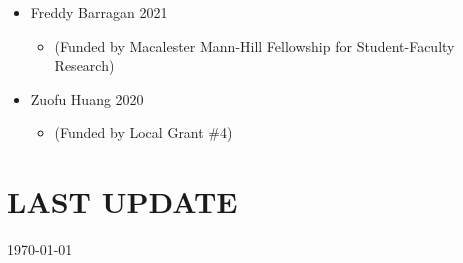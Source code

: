 \documentclass[margin]{res}
\begin{document}
\begin{resume}
\begin{itemize}
\item Freddy Barragan \hfill 2021 
	\begin{itemize}[leftmargin=-0in] \vspace{-0.2cm}
	\item[]\begin{footnotesize}(Funded by Macalester Mann-Hill Fellowship for Student-Faculty Research) \end{footnotesize}
	\end{itemize}

\item Zuofu Huang \hfill 2020 
	\begin{itemize}[leftmargin=-0in] \vspace{-0.2cm}
	\item[]\begin{footnotesize}(Funded by Local Grant \#4) \end{footnotesize}
	\end{itemize}
\end{itemize}

	

	
		


			
\section{LAST UPDATE} \today

\end{resume}
\end{document}
